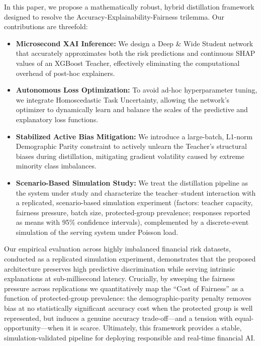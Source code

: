 \documentclass{wscpaperproc}
\theoremstyle{wsc}
\begin{document}
In this paper, we propose a mathematically robust, hybrid distillation framework designed to resolve the Accuracy-Explainability-Fairness trilemma. Our contributions are threefold:


\begin{itemize}
    \item \textbf{Microsecond XAI Inference:} We design a Deep \& Wide Student network that accurately approximates both the risk predictions and continuous SHAP values of an XGBoost Teacher, effectively eliminating the computational overhead of post-hoc explainers.
    \item \textbf{Autonomous Loss Optimization:} To avoid ad-hoc hyperparameter tuning, we integrate Homoscedastic Task Uncertainty, allowing the network’s optimizer to dynamically learn and balance the scales of the predictive and explanatory loss functions.
    \item \textbf{Stabilized Active Bias Mitigation:} We introduce a large-batch, L1-norm Demographic Parity constraint to actively unlearn the Teacher's structural biases during distillation, mitigating gradient volatility caused by extreme minority class imbalances.
    \item \textbf{Scenario-Based Simulation Study:} We treat the distillation pipeline as the system under study and characterize the teacher--student interaction with a replicated, scenario-based simulation experiment (factors: teacher capacity, fairness pressure, batch size, protected-group prevalence; responses reported as means with 95\% confidence intervals), complemented by a discrete-event simulation of the serving system under Poisson load.
\end{itemize}





Our empirical evaluation across highly imbalanced financial risk datasets, conducted as a replicated simulation experiment, demonstrates that the proposed architecture preserves high predictive discrimination while serving intrinsic explanations at sub-millisecond latency. Crucially, by sweeping the fairness pressure across replications we quantitatively map the ``Cost of Fairness'' as a function of protected-group prevalence: the demographic-parity penalty removes bias at no statistically significant accuracy cost when the protected group is well represented, but induces a genuine accuracy trade-off—and a tension with equal-opportunity—when it is scarce. Ultimately, this framework provides a stable, simulation-validated pipeline for deploying responsible and real-time financial AI.
\end{document}
